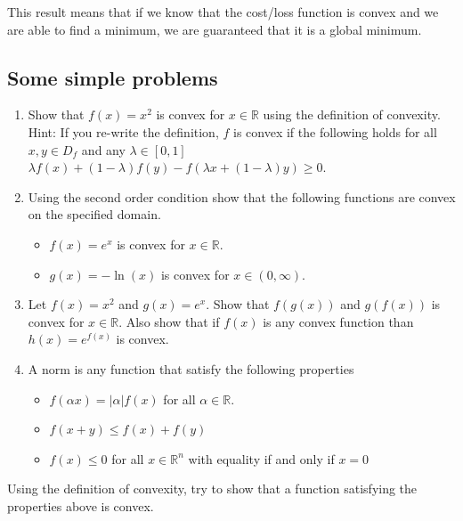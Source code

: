 \documentclass[%
oneside,                 %
final,                   %
10pt]{article}
\begin{document}
This result means that if we know that the cost/loss function is convex and we are able to find a minimum, we are guaranteed that it is a global minimum.

\subsection{Some simple problems}

\begin{enumerate}
\item Show that $f(x)=x^2$ is convex for $x \in \mathbb{R}$ using the definition of convexity. Hint: If you re-write the definition, $f$ is convex if the following holds for all $x,y \in D_f$ and any $\lambda \in [0,1]$ $\lambda f(x)+(1-\lambda)f(y)-f(\lambda x + (1-\lambda) y ) \geq 0$.

\item Using the second order condition show that the following functions are convex on the specified domain.
\begin{itemize}

 \item $f(x) = e^x$ is convex for $x \in \mathbb{R}$.

 \item $g(x) = -\ln(x)$ is convex for $x \in (0,\infty)$.

\end{itemize}

\noindent
\item Let $f(x) = x^2$ and $g(x) = e^x$. Show that $f(g(x))$ and $g(f(x))$ is convex for $x \in \mathbb{R}$. Also show that if $f(x)$ is any convex function than $h(x) = e^{f(x)}$ is convex.

\item A norm is any function that satisfy the following properties
\begin{itemize}

 \item $f(\alpha x) = |\alpha| f(x)$ for all $\alpha \in \mathbb{R}$.

 \item $f(x+y) \leq f(x) + f(y)$

 \item $f(x) \leq 0$ for all $x \in \mathbb{R}^n$ with equality if and only if $x = 0$
\end{itemize}

\noindent
\end{enumerate}

\noindent
Using the definition of convexity, try to show that a function satisfying the properties above is convex.
\end{document}
